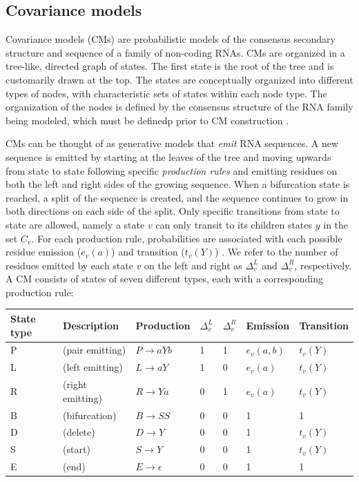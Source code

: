 \documentclass[11pt]{article}
\begin{document}
\subsection{Covariance models}

Covariance models (CMs) are probabilistic
models of the consensus secondary structure and sequence of a family
of non-coding RNAs. 
CMs are organized in a tree-like, directed
graph of states. The first state is the root of the tree
and is customarily drawn at the top. 
The states are conceptually organized into different types of nodes,
with characteristic sets of states within each node type. The
organization of the nodes is defined by the consensus
structure of the RNA family being modeled, which must be definedp
prior to CM construction \cite{Eddy02b, infguide03}.

CMs can be thought of as generative models that
\emph{emit} RNA sequences.
A new sequence is emitted by starting at
the leaves of the tree and moving upwards from state to state
following specific \emph{production rules} and 
emitting residues on both the left and right sides of the growing
sequence.
When a bifurcation state is reached, a split of the sequence
is created, and the sequence continues to grow in both directions on
each side of the split. Only specific transitions from
state to state are allowed, namely a state $v$ can only transit to
its children states $y$ in the set $C_v$. 
For each production rule, probabilities are associated with each
possible residue emission
($e_v(a)$) and transition ($t_v(Y)$) \cite{Eddy94}. 
We refer to the number of residues emitted by
each state $v$ on the left and right as $\Delta_v^{L}$ and
$\Delta_v^{R}$, respectively. A CM consists of states of seven
different types, each with a corresponding production rule:

\vspace{0.5em}
\begin{tabular}{lllllll}
State type & Description &  Production   & $\Delta_v^{L}$ & $\Delta_v^{R}$ & Emission & Transition\\ \hline
P & (pair emitting)   & $P \rightarrow a Y b$ & 1 & 1 & $e_v(a,b)$ & $t_v(Y)$  \\
L & (left emitting)   & $L \rightarrow a Y$   & 1 & 0 & $e_v(a)$   & $t_v(Y)$  \\
R & (right emitting)  & $R \rightarrow Y a$   & 0 & 1 & $e_v(a)$   & $t_v(Y)$  \\
B & (bifurcation)     & $B \rightarrow S S$   & 0 & 0 & 1     &     1     \\
D & (delete)          & $D \rightarrow Y$     & 0 & 0 & 1     &   $t_v(Y)$  \\
S & (start)           & $S \rightarrow Y$     & 0 & 0 &    1     & $t_v(Y)$  \\
E & (end)             & $E \rightarrow \epsilon$ & 0 & 0 & 1     &     1     \\
\end{tabular}
\vspace{0.5em}
\end{document}
